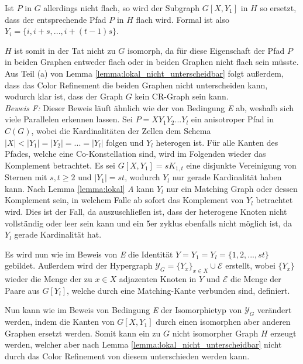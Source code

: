 Ist $P$ in $G$ allerdings nicht flach, so wird der Subgraph $G[X,Y_1]$ in $H$ so ersetzt, dass der entsprechende Pfad $P$ in $H$ flach wird.
Formal ist also $Y_i=\{i,i+s,...,i+(t-1)s\}$.

$H$ ist somit in der Tat nicht zu $G$ isomorph, da für diese Eigenschaft der Pfad $P$ in beiden Graphen entweder flach oder in beiden Graphen nicht flach sein müsste.
Aus Teil (a) von Lemma \ref{lemma:lokal_nicht_unterscheidbar} folgt außerdem, dass das Color Refinement die beiden Graphen nicht unterscheiden kann, wodurch klar ist, dass der Graph $G$ kein CR-Graph sein kann.\\

\emph{Beweis F:} Dieser Beweis läuft ähnlich wie der von Bedingung \emph{E} ab, weshalb sich viele Parallelen erkennen lassen.
Sei $P=XY_1Y_2...Y_l$ ein anisotroper Pfad in $C(G)$, wobei die Kardinalitäten der Zellen dem Schema $|X|<|Y_1|=|Y_2|=...=|Y_l|$ folgen und $Y_l$ heterogen ist.
Für alle Kanten des Pfades, welche eine Co-Konstellation sind, wird im Folgenden wieder das Komplement betrachtet.
Es sei $G[X,Y_1]=sK_{1,t}$ eine disjunkte Vereinigung von Sternen mit $s,t\geq 2$ und $|Y_1|=st$, wodurch $Y_l$ nur gerade Kardinalität haben kann.
Nach Lemma \ref{lemma:lokal} \emph{A} kann $Y_l$ nur ein Matching Graph oder dessen Komplement sein, in welchem Falle ab sofort das Komplement von $Y_l$ betrachtet wird.
Dies ist der Fall, da auszuschließen ist, dass der heterogene Knoten nicht vollständig oder leer sein kann und ein 5er \gls{zyklus} ebenfalls nicht möglich ist, da $Y_l$ gerade Kardinalität hat.

Es wird nun wie im Beweis von \emph{E} die Identität $Y=Y_1=Y_l=\{1,2,...,st\}$ gebildet.
Außerdem wird der Hypergraph $\mathcal{Y}_G=\{Y_x\}_{x\in X}\cup \mathcal{E}$ erstellt, wobei $\{Y_x\}$ wieder die Menge der zu $x\in X$ adjazenten Knoten in $Y$ und $\mathcal{E}$ die Menge der Paare aus $G[Y_l]$, welche durch eine Matching-Kante verbunden sind, definiert.

Nun kann wie im Beweis von Bedingung \emph{E} der Isomorphietyp von $\mathcal{Y}_G$ verändert werden, indem die Kanten von $G[X,Y_1]$ durch einen isomorphen aber anderen Graphen ersetzt werden.
Somit kann ein zu $G$ nicht isomorpher Graph $H$ erzeugt werden, welcher aber nach Lemma \ref{lemma:lokal_nicht_unterscheidbar} nicht durch das Color Refinement von diesem unterschieden werden kann.


